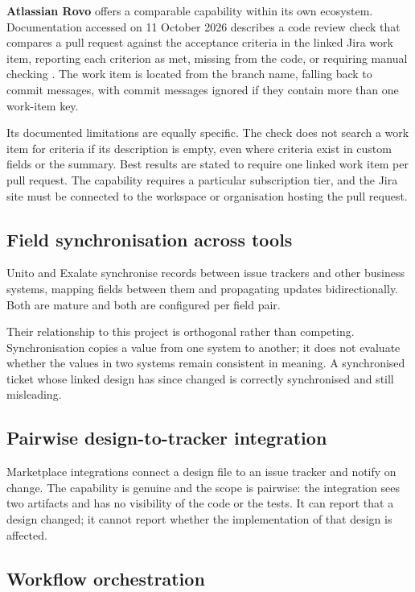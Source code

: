 \textbf{Atlassian Rovo} offers a comparable capability within its own ecosystem.
Documentation accessed on 11 October 2026 describes a code review check that
compares a pull request against the acceptance criteria in the linked Jira work
item, reporting each criterion as met, missing from the code, or requiring
manual checking \cite{rovodocs}. The work item is located from the branch name,
falling back to commit messages, with commit messages ignored if they contain
more than one work-item key.

Its documented limitations are equally specific. The check does not search a
work item for criteria if its description is empty, even where criteria exist in
custom fields or the summary. Best results are stated to require one linked work
item per pull request. The capability requires a particular subscription tier,
and the Jira site must be connected to the workspace or organisation hosting the
pull request.

\subsection{Field synchronisation across tools}

Unito and Exalate synchronise records between issue trackers and other business
systems, mapping fields between them and propagating updates bidirectionally.
Both are mature and both are configured per field pair.

Their relationship to this project is orthogonal rather than competing.
Synchronisation copies a value from one system to another; it does not evaluate
whether the values in two systems remain consistent in meaning. A synchronised
ticket whose linked design has since changed is correctly synchronised and still
misleading.

\subsection{Pairwise design-to-tracker integration}

Marketplace integrations connect a design file to an issue tracker and notify on
change. The capability is genuine and the scope is pairwise: the integration
sees two artifacts and has no visibility of the code or the tests. It can report
that a design changed; it cannot report whether the implementation of that
design is affected.

\subsection{Workflow orchestration}

